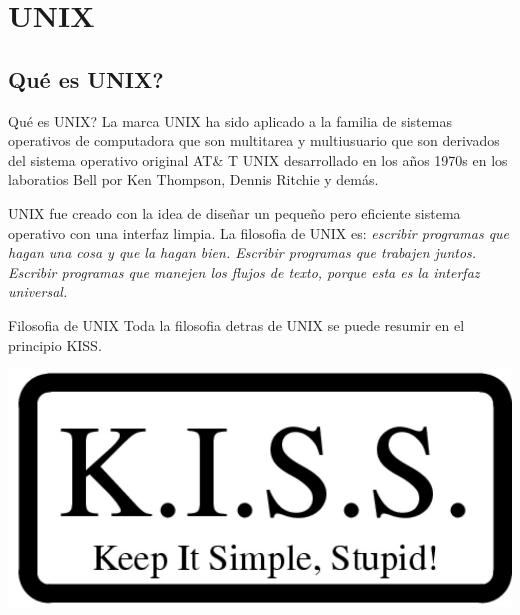 \documentclass[11pt]{beamer}
\begin{document}
\section{UNIX}
	\subsection{Qué es UNIX?}
		\begin{frame}{Qué es UNIX?}
			La marca UNIX ha sido aplicado a la familia de sistemas operativos de computadora que son multitarea y multiusuario que son derivados del sistema operativo original AT\& T UNIX desarrollado en los años 1970s en los laboratios Bell por Ken Thompson, Dennis Ritchie y demás.
			
			UNIX fue creado con la idea de diseñar un pequeño pero eficiente sistema operativo con una interfaz limpia. La filosofia de UNIX es: \textit{escribir programas que hagan una cosa y que la hagan bien. Escribir programas que trabajen juntos. Escribir programas que manejen los flujos de texto, porque esta es la interfaz universal.}
		\end{frame}
		\begin{frame}{Filosofia de UNIX}
			Toda la filosofia detras de UNIX se puede resumir en el principio KISS.
			
			\includegraphics[scale=0.4]{unixfil.jpg}
		\end{frame}
\end{document}
